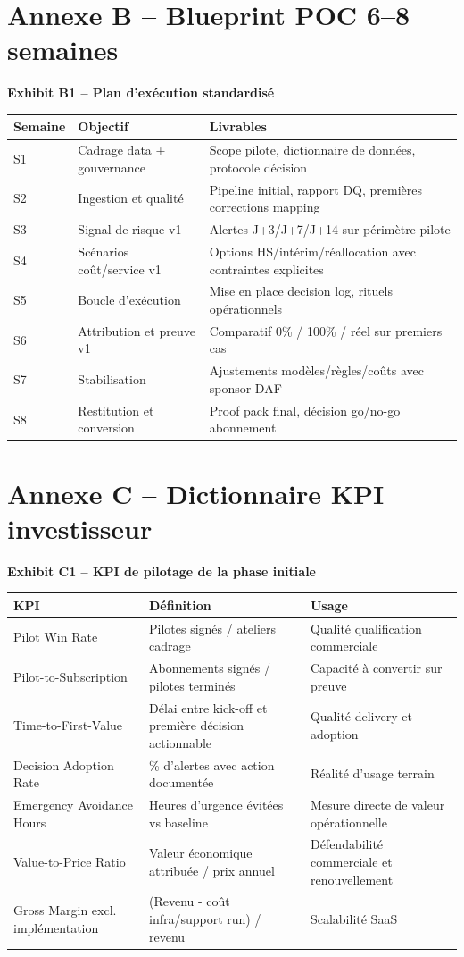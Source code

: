 \documentclass[11pt,a4paper]{article}
\newcommand{\exhibit}[1]{\vspace{2mm}\noindent\colorbox{PraedixaLight}{\parbox{\dimexpr\linewidth-2\fboxsep\relax}{\textbf{#1}}}\vspace{1mm}}
\begin{document}
\section{Annexe B -- Blueprint POC 6--8 semaines}
\exhibit{Exhibit B1 -- Plan d'exécution standardisé}
\begin{tabularx}{\linewidth}{@{}l X X@{}}
\toprule
\textbf{Semaine} & \textbf{Objectif} & \textbf{Livrables} \\
\midrule
S1 & Cadrage data + gouvernance & Scope pilote, dictionnaire de données, protocole décision \\
S2 & Ingestion et qualité & Pipeline initial, rapport DQ, premières corrections mapping \\
S3 & Signal de risque v1 & Alertes J+3/J+7/J+14 sur périmètre pilote \\
S4 & Scénarios coût/service v1 & Options HS/intérim/réallocation avec contraintes explicites \\
S5 & Boucle d'exécution & Mise en place decision log, rituels opérationnels \\
S6 & Attribution et preuve v1 & Comparatif 0\% / 100\% / réel sur premiers cas \\
S7 & Stabilisation & Ajustements modèles/règles/coûts avec sponsor DAF \\
S8 & Restitution et conversion & Proof pack final, décision go/no-go abonnement \\
\bottomrule
\end{tabularx}

\section{Annexe C -- Dictionnaire KPI investisseur}
\exhibit{Exhibit C1 -- KPI de pilotage de la phase initiale}
\begin{tabularx}{\linewidth}{@{}l X X@{}}
\toprule
\textbf{KPI} & \textbf{Définition} & \textbf{Usage} \\
\midrule
Pilot Win Rate & Pilotes signés / ateliers cadrage & Qualité qualification commerciale \\
Pilot-to-Subscription & Abonnements signés / pilotes terminés & Capacité à convertir sur preuve \\
Time-to-First-Value & Délai entre kick-off et première décision actionnable & Qualité delivery et adoption \\
Decision Adoption Rate & \% d'alertes avec action documentée & Réalité d'usage terrain \\
Emergency Avoidance Hours & Heures d'urgence évitées vs baseline & Mesure directe de valeur opérationnelle \\
Value-to-Price Ratio & Valeur économique attribuée / prix annuel & Défendabilité commerciale et renouvellement \\
Gross Margin excl. implémentation & (Revenu - coût infra/support run) / revenu & Scalabilité SaaS \\
\bottomrule
\end{tabularx}
\end{document}
